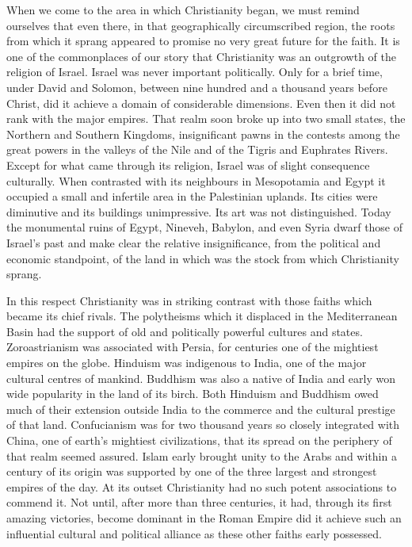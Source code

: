 When we come to the area in which Christianity began, we must remind ourselves that even there, in that geographically circumscribed region, the roots from which it sprang appeared to promise no very great future for the faith. It is one of the commonplaces of our story that Christianity was an outgrowth of the religion of Israel. Israel was never important politically. Only for a brief time, under David and Solomon, between nine hundred and a thousand years before Christ, did it achieve a domain of considerable dimensions. Even then it did not rank with the major empires. That realm soon broke up into two small states, the Northern and Southern Kingdoms, insignificant pawns in the contests among the great powers in the valleys of the Nile and of the Tigris and Euphrates Rivers. Except for what came through its religion, Israel was of slight consequence culturally. When contrasted with its neighbours in Mesopotamia and Egypt it occupied a small and infertile area in the Palestinian uplands. Its cities were diminutive and its buildings unimpressive. Its art was not distinguished. Today the monumental ruins of Egypt, Nineveh, Babylon, and even Syria dwarf those of Israel's past and make clear the relative insignificance, from the political and economic standpoint, of the land in which was the stock from which Christianity sprang.

In this respect Christianity was in striking contrast with those faiths which became its chief rivals. The polytheisms which it displaced in the Mediterranean Basin had the support of old and politically powerful cultures and states. Zoroastrianism was associated with Persia, for centuries one of the mightiest empires on the globe. Hinduism was indigenous to India, one of the major cultural centres of mankind. Buddhism was also a native of India and early won wide popularity in the land of its birch. Both Hinduism and Buddhism owed much of their extension outside India to the commerce and the cultural prestige of that land. Confucianism was for two thousand years so closely integrated with China, one of earth's mightiest civilizations, that its spread on the periphery of that realm seemed assured. Islam early brought unity to the Arabs and within a century of its origin was supported by one of the three largest and strongest empires of the day. At its outset Christianity had no such potent associations to commend it. Not until, after more than three centuries, it had, through its first amazing victories, become dominant in the Roman Empire did it achieve such an influential cultural and political alliance as these other faiths early possessed.

